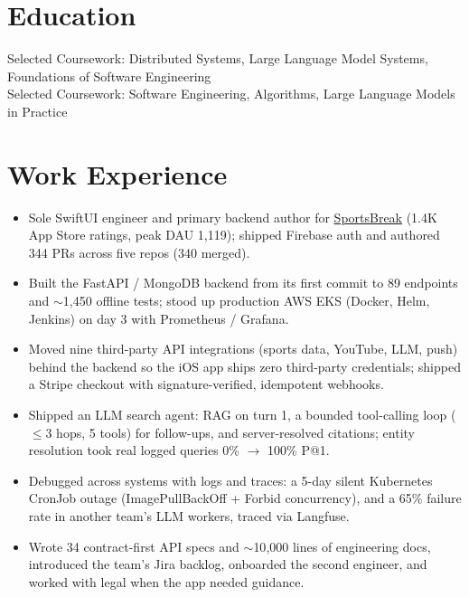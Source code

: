 \documentclass[11pt, letterpaper]{article}
\begin{document}

\section{Education}
Selected Coursework: Distributed Systems, Large Language Model Systems, Foundations of Software Engineering\\[1pt]
Selected Coursework: Software Engineering, Algorithms, Large Language Models in Practice

\section{Work Experience}
\begin{itemize}
  \item Sole SwiftUI engineer and primary backend author for \href{https://apps.apple.com/app/id6762649287}{SportsBreak} (1.4K App Store ratings, peak DAU 1{,}119); shipped Firebase auth and authored 344 PRs across five repos (340 merged).
  \item Built the FastAPI / MongoDB backend from its first commit to 89 endpoints and $\sim$1{,}450 offline tests; stood up production AWS EKS (Docker, Helm, Jenkins) on day 3 with Prometheus / Grafana.
  \item Moved nine third-party API integrations (sports data, YouTube, LLM, push) behind the backend so the iOS app ships zero third-party credentials; shipped a Stripe checkout with signature-verified, idempotent webhooks.
  \item Shipped an LLM search agent: RAG on turn 1, a bounded tool-calling loop ($\le$3 hops, 5 tools) for follow-ups, and server-resolved citations; entity resolution took real logged queries 0\% $\to$ 100\% P@1.
  \item Debugged across systems with logs and traces: a 5-day silent Kubernetes CronJob outage (ImagePullBackOff + Forbid concurrency), and a 65\% failure rate in another team's LLM workers, traced via Langfuse.
  \item Wrote 34 contract-first API specs and $\sim$10{,}000 lines of engineering docs, introduced the team's Jira backlog, onboarded the second engineer, and worked with legal when the app needed guidance.
\end{itemize}
\end{document}
